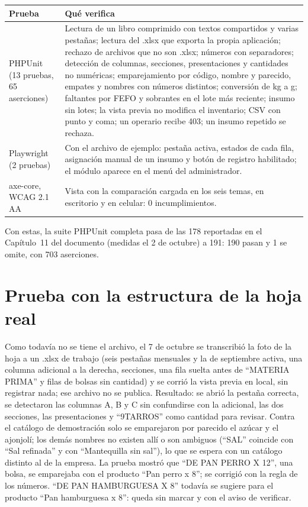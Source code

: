 \documentclass[letterpaper,11pt]{article}
\begin{document}
\begin{table}[H]
\centering
\begin{tabularx}{\textwidth}{lX}
\toprule
\textbf{Prueba} & \textbf{Qué verifica} \\
\midrule
PHPUnit (13 pruebas, 65 aserciones) & Lectura de un libro comprimido con textos compartidos y varias pestañas; lectura del .xlsx que exporta la propia aplicación; rechazo de archivos que no son .xlsx; números con separadores; detección de columnas, secciones, presentaciones y cantidades no numéricas; emparejamiento por código, nombre y parecido, empates y nombres con números distintos; conversión de kg a g; faltantes por FEFO y sobrantes en el lote más reciente; insumo sin lotes; la vista previa no modifica el inventario; CSV con punto y coma; un operario recibe 403; un insumo repetido se rechaza. \\
Playwright (2 pruebas) & Con el archivo de ejemplo: pestaña activa, estados de cada fila, asignación manual de un insumo y botón de registro habilitado; el módulo aparece en el menú del administrador. \\
axe-core, WCAG 2.1 AA & Vista con la comparación cargada en los seis temas, en escritorio y en celular: 0 incumplimientos. \\
\bottomrule
\end{tabularx}
\end{table}

Con estas, la suite PHPUnit completa pasa de las 178 reportadas en el Capítulo~11 del documento (medidas el 2 de octubre) a 191: 190 pasan y 1 se omite, con 703 aserciones.

\section{Prueba con la estructura de la hoja real}

Como todavía no se tiene el archivo, el 7 de octubre se transcribió la foto de la hoja a un .xlsx de trabajo (seis pestañas mensuales y la de septiembre activa, una columna adicional a la derecha, secciones, una fila suelta antes de ``MATERIA PRIMA'' y filas de bolsas sin cantidad) y se corrió la vista previa en local, sin registrar nada; ese archivo no se publica. Resultado: se abrió la pestaña correcta, se detectaron las columnas A, B y C sin confundirse con la adicional, las dos secciones, las presentaciones y ``9TARROS'' como cantidad para revisar. Contra el catálogo de demostración solo se emparejaron por parecido el azúcar y el ajonjolí; los demás nombres no existen allí o son ambiguos (``SAL'' coincide con ``Sal refinada'' y con ``Mantequilla sin sal''), lo que se espera con un catálogo distinto al de la empresa. La prueba mostró que ``DE PAN PERRO X 12'', una bolsa, se emparejaba con el producto ``Pan perro x 8''; se corrigió con la regla de los números. ``DE PAN HAMBURGUESA X 8'' todavía se sugiere para el producto ``Pan hamburguesa x 8'': queda sin marcar y con el aviso de verificar.
\end{document}
